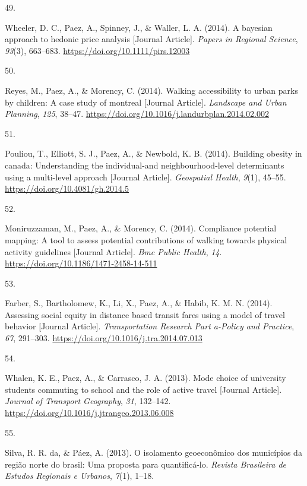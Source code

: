 \documentclass[10pt,a4paper,]{twentysecondcv}
\newlength{\csllabelwidth}
\newcommand{\CSLLeftMargin}[1]{\parbox[t]{\csllabelwidth}{#1}}
\newcommand{\CSLRightInline}[1]{\parbox[t]{\linewidth - \csllabelwidth}{#1}}
\begin{document}
\leavevmode{}%
\CSLLeftMargin{49. }%
\CSLRightInline{Wheeler, D. C., Paez, A., Spinney, J., \& Waller, L. A.
(2014). A bayesian approach to hedonic price analysis {[}Journal
Article{]}. \emph{Papers in Regional Science}, \emph{93}(3), 663--683.
\url{https://doi.org/10.1111/pirs.12003}}

\leavevmode{}%
\CSLLeftMargin{50. }%
\CSLRightInline{Reyes, M., Paez, A., \& Morency, C. (2014). Walking
accessibility to urban parks by children: A case study of montreal
{[}Journal Article{]}. \emph{Landscape and Urban Planning}, \emph{125},
38--47. \url{https://doi.org/10.1016/j.landurbplan.2014.02.002}}

\leavevmode{}%
\CSLLeftMargin{51. }%
\CSLRightInline{Pouliou, T., Elliott, S. J., Paez, A., \& Newbold, K. B.
(2014). Building obesity in canada: Understanding the individual-and
neighbourhood-level determinants using a multi-level approach {[}Journal
Article{]}. \emph{Geospatial Health}, \emph{9}(1), 45--55.
\url{https://doi.org/10.4081/gh.2014.5}}

\leavevmode{}%
\CSLLeftMargin{52. }%
\CSLRightInline{Moniruzzaman, M., Paez, A., \& Morency, C. (2014).
Compliance potential mapping: A tool to assess potential contributions
of walking towards physical activity guidelines {[}Journal Article{]}.
\emph{Bmc Public Health}, \emph{14}.
\url{https://doi.org/10.1186/1471-2458-14-511}}

\leavevmode{}%
\CSLLeftMargin{53. }%
\CSLRightInline{Farber, S., Bartholomew, K., Li, X., Paez, A., \& Habib,
K. M. N. (2014). Assessing social equity in distance based transit fares
using a model of travel behavior {[}Journal Article{]}.
\emph{Transportation Research Part a-Policy and Practice}, \emph{67},
291--303. \url{https://doi.org/10.1016/j.tra.2014.07.013}}

\leavevmode{}%
\CSLLeftMargin{54. }%
\CSLRightInline{Whalen, K. E., Paez, A., \& Carrasco, J. A. (2013). Mode
choice of university students commuting to school and the role of active
travel {[}Journal Article{]}. \emph{Journal of Transport Geography},
\emph{31}, 132--142.
\url{https://doi.org/10.1016/j.jtrangeo.2013.06.008}}

\leavevmode{}%
\CSLLeftMargin{55. }%
\CSLRightInline{Silva, R. R. da, \& Páez, A. (2013). O isolamento
geoeconômico dos municípios da região norte do brasil: Uma proposta para
quantificá-lo. \emph{Revista Brasileira de Estudos Regionais e Urbanos},
\emph{7}(1), 1--18.}
\end{document}
